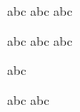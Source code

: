 \documentclass{kapital}
\begin{document}
  abc
  \parbreak{}
  \parcont{}
  abc abc

  abc
  abc abc

  abc

  abc abc
\end{document}
